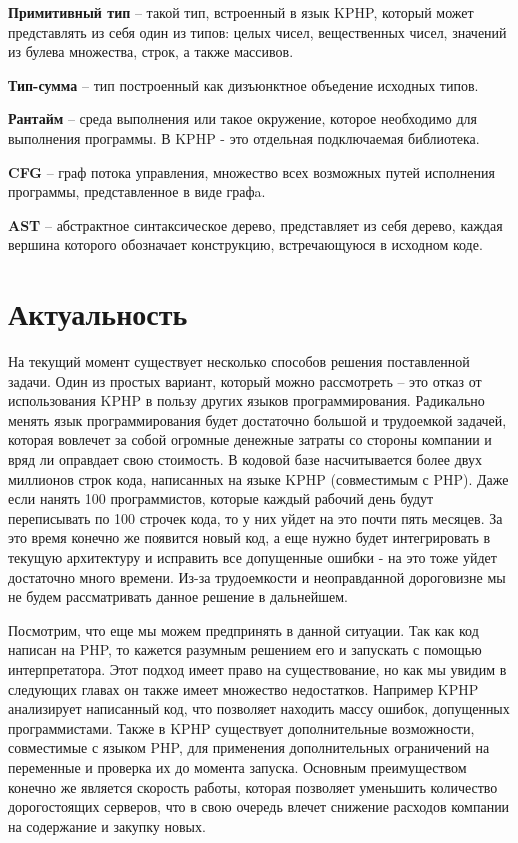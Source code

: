 \textbf{Примитивный тип} -- такой тип, встроенный в язык KPHP, который может представлять из себя один из типов: целых чисел, вещественных чисел, значений из булева множества, строк, а также массивов.

\textbf{Тип-сумма} -- тип построенный как дизъюнктное объедение исходных типов.

\textbf{Рантайм} -- среда выполнения или такое окружение, которое необходимо для выполнения программы. В KPHP - это отдельная подключаемая библиотека.

\textbf{CFG} -- граф потока управления, множество всех возможных путей исполнения программы, представленное в виде графa.

\textbf{AST} -- абстрактное синтаксическое дерево, представляет из себя дерево, каждая вершина которого обозначает конструкцию, встречающуюся в исходном коде.

\section{Актуальность}
\label{sec:actuality}
На текущий момент существует несколько способов решения поставленной задачи. Один из простых вариант, который можно рассмотреть -- это отказ от использования KPHP в пользу других языков программирования. 
Радикально менять язык программирования будет достаточно большой и трудоемкой задачей, которая вовлечет за собой огромные денежные затраты со стороны компании и вряд ли оправдает свою стоимость. 
В кодовой базе насчитывается более двух миллионов строк кода, написанных на языке KPHP (совместимым с PHP).
Даже если нанять 100 программистов, которые каждый рабочий день будут переписывать по 100 строчек кода, то у них уйдет на это почти пять месяцев. За это время конечно же появится новый код, а еще нужно будет интегрировать в текущую архитектуру и исправить все допущенные ошибки - на это тоже уйдет достаточно много времени.
Из-за трудоемкости и неоправданной дороговизне мы не будем рассматривать данное решение в дальнейшем.

Посмотрим, что еще мы можем предпринять в данной ситуации. 
Так как код написан на PHP, то кажется разумным решением его и запускать с помощью интерпретатора. 
Этот подход имеет право на существование, но как мы увидим в следующих главах он также имеет множество недостатков.
Например KPHP анализирует написанный код, что позволяет находить массу ошибок, допущенных программистами.
Также в KPHP существует дополнительные возможности, совместимые с языком PHP, для применения дополнительных ограничений на переменные и проверка их до момента запуска.
Основным преимуществом конечно же является скорость работы, которая позволяет уменьшить количество дорогостоящих серверов, что в свою очередь влечет снижение расходов компании на содержание и закупку новых.

